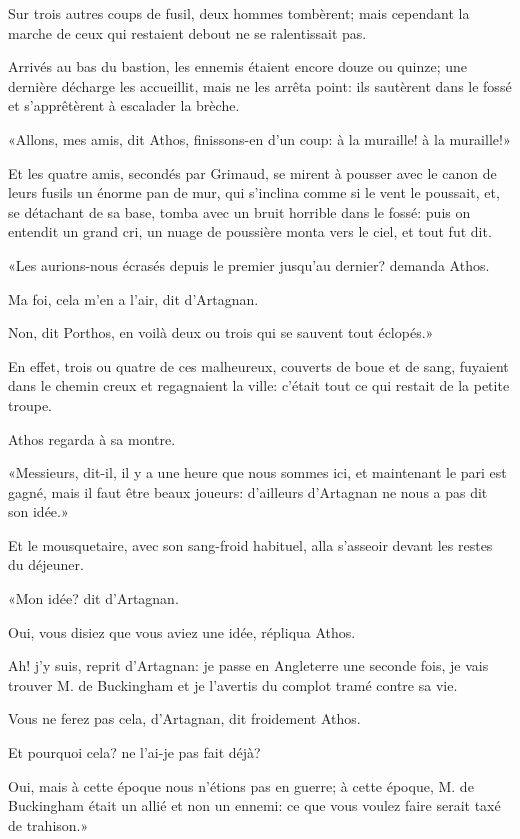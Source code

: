 Sur trois autres coups de fusil, deux hommes tombèrent; mais cependant la marche de ceux qui restaient debout ne se ralentissait pas. 

Arrivés au bas du bastion, les ennemis étaient encore douze ou quinze; une dernière décharge les accueillit, mais ne les arrêta point: ils sautèrent dans le fossé et s'apprêtèrent à escalader la brèche. 

«Allons, mes amis, dit Athos, finissons-en d'un coup: à la muraille! à la muraille!» 

Et les quatre amis, secondés par Grimaud, se mirent à pousser avec le canon de leurs fusils un énorme pan de mur, qui s'inclina comme si le vent le poussait, et, se détachant de sa base, tomba avec un bruit horrible dans le fossé: puis on entendit un grand cri, un nuage de poussière monta vers le ciel, et tout fut dit. 

«Les aurions-nous écrasés depuis le premier jusqu'au dernier? demanda Athos. 

\speak  Ma foi, cela m'en a l'air, dit d'Artagnan. 

\speak  Non, dit Porthos, en voilà deux ou trois qui se sauvent tout éclopés.» 

En effet, trois ou quatre de ces malheureux, couverts de boue et de sang, fuyaient dans le chemin creux et regagnaient la ville: c'était tout ce qui restait de la petite troupe. 

Athos regarda à sa montre. 

«Messieurs, dit-il, il y a une heure que nous sommes ici, et maintenant le pari est gagné, mais il faut être beaux joueurs: d'ailleurs d'Artagnan ne nous a pas dit son idée.» 

Et le mousquetaire, avec son sang-froid habituel, alla s'asseoir devant les restes du déjeuner. 

«Mon idée? dit d'Artagnan. 

\speak  Oui, vous disiez que vous aviez une idée, répliqua Athos. 

\speak  Ah! j'y suis, reprit d'Artagnan: je passe en Angleterre une seconde fois, je vais trouver M. de Buckingham et je l'avertis du complot tramé contre sa vie. 

\speak  Vous ne ferez pas cela, d'Artagnan, dit froidement Athos. 

\speak  Et pourquoi cela? ne l'ai-je pas fait déjà? 

\speak  Oui, mais à cette époque nous n'étions pas en guerre; à cette époque, M. de Buckingham était un allié et non un ennemi: ce que vous voulez faire serait taxé de trahison.» 

